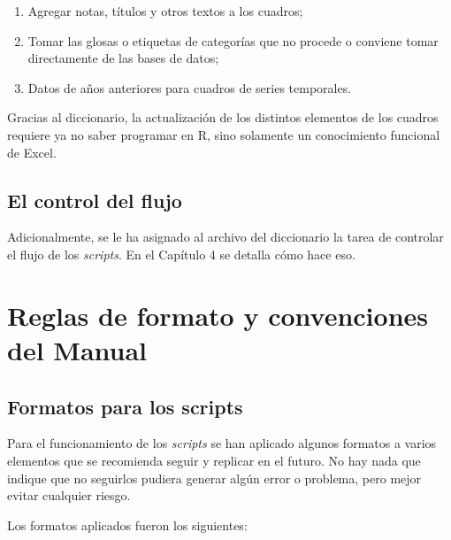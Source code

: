\documentclass[
  spanish,
]{book}
\begin{document}
\begin{enumerate}
\def\labelenumi{\arabic{enumi}.}
\item
  Agregar notas, títulos y otros textos a los cuadros;
\item
  Tomar las glosas o etiquetas de categorías que no procede o conviene tomar directamente de las bases de datos;
\item
  Datos de años anteriores para cuadros de series temporales.
\end{enumerate}

Gracias al diccionario, la actualización de los distintos elementos de los cuadros requiere ya no saber programar en R, sino solamente un conocimiento funcional de Excel.

\hypertarget{el-control-del-flujo}{%
\section{El control del flujo}\label{el-control-del-flujo}}

Adicionalmente, se le ha asignado al archivo del diccionario la tarea de controlar el flujo de los \emph{scripts}. En el Capítulo 4 se detalla cómo hace eso.

\hypertarget{reglas-de-formato-y-convenciones-del-manual}{%
\chapter{Reglas de formato y convenciones del Manual}\label{reglas-de-formato-y-convenciones-del-manual}}

\hypertarget{formatos-para-los-scripts}{%
\section{Formatos para los scripts}\label{formatos-para-los-scripts}}

Para el funcionamiento de los \emph{scripts} se han aplicado algunos formatos a varios elementos que se recomienda seguir y replicar en el futuro. No hay nada que indique que no seguirlos pudiera generar algún error o problema, pero mejor evitar cualquier riesgo.

Los formatos aplicados fueron los siguientes:
\end{document}
